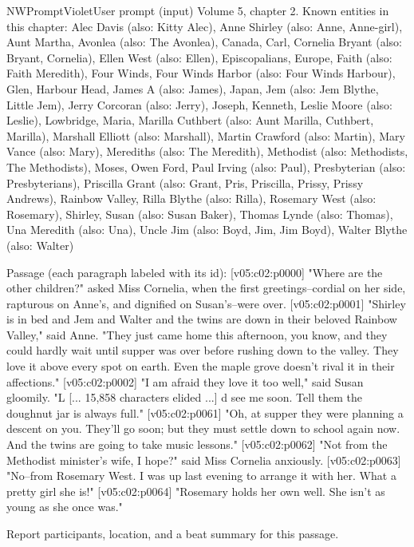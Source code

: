\begin{nwprompt}{NWPromptViolet}{User prompt (input)}
Volume 5, chapter 2.
Known entities in this chapter: Alec Davis (also: Kitty Alec), Anne Shirley (also: Anne, Anne-girl), Aunt Martha, Avonlea (also: The Avonlea), Canada, Carl, Cornelia Bryant (also: Bryant, Cornelia), Ellen West (also: Ellen), Episcopalians, Europe, Faith (also: Faith Meredith), Four Winds, Four Winds Harbor (also: Four Winds Harbour), Glen, Harbour Head, James A (also: James), Japan, Jem (also: Jem Blythe, Little Jem), Jerry Corcoran (also: Jerry), Joseph, Kenneth, Leslie Moore (also: Leslie), Lowbridge, Maria, Marilla Cuthbert (also: Aunt Marilla, Cuthbert, Marilla), Marshall Elliott (also: Marshall), Martin Crawford (also: Martin), Mary Vance (also: Mary), Merediths (also: The Meredith), Methodist (also: Methodists, The Methodists), Moses, Owen Ford, Paul Irving (also: Paul), Presbyterian (also: Presbyterians), Priscilla Grant (also: Grant, Pris, Priscilla, Prissy, Prissy Andrews), Rainbow Valley, Rilla Blythe (also: Rilla), Rosemary West (also: Rosemary), Shirley, Susan (also: Susan Baker), Thomas Lynde (also: Thomas), Una Meredith (also: Una), Uncle Jim (also: Boyd, Jim, Jim Boyd), Walter Blythe (also: Walter)

Passage (each paragraph labeled with its id):
[v05:c02:p0000] "Where are the other children?" asked Miss Cornelia, when the first greetings--cordial on her side, rapturous on Anne's, and dignified on Susan's--were over.
[v05:c02:p0001] "Shirley is in bed and Jem and Walter and the twins are down in their beloved Rainbow Valley," said Anne. "They just came home this afternoon, you know, and they could hardly wait until supper was over before rushing down to the valley. They love it above every spot on earth. Even the maple grove doesn't rival it in their affections."
[v05:c02:p0002] "I am afraid they love it too well," said Susan gloomily. "L
[... 15,858 characters elided ...]
d see me soon. Tell them the doughnut jar is always full."
[v05:c02:p0061] "Oh, at supper they were planning a descent on you. They'll go soon; but they must settle down to school again now. And the twins are going to take music lessons."
[v05:c02:p0062] "Not from the Methodist minister's wife, I hope?" said Miss Cornelia anxiously.
[v05:c02:p0063] "No--from Rosemary West. I was up last evening to arrange it with her. What a pretty girl she is!"
[v05:c02:p0064] "Rosemary holds her own well. She isn't as young as she once was."

Report participants, location, and a beat summary for this passage.
\end{nwprompt}

